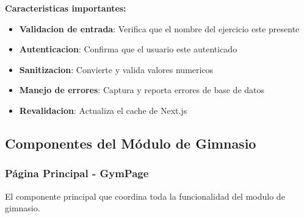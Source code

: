 \documentclass[12pt,a4paper]{article}
\begin{document}
\textbf{Caracteristicas importantes:}
\begin{itemize}
    \item \textbf{Validacion de entrada}: Verifica que el nombre del ejercicio este presente
    \item \textbf{Autenticacion}: Confirma que el usuario este autenticado
    \item \textbf{Sanitizacion}: Convierte y valida valores numericos
    \item \textbf{Manejo de errores}: Captura y reporta errores de base de datos
    \item \textbf{Revalidacion}: Actualiza el cache de Next.js
\end{itemize}

\subsection{Componentes del Módulo de Gimnasio}

\subsubsection{Página Principal - GymPage}

El componente principal que coordina toda la funcionalidad del modulo de gimnasio.
\end{document}
